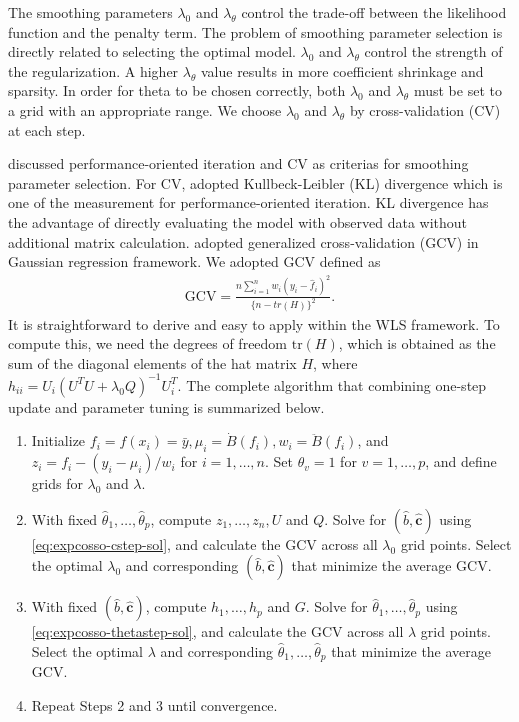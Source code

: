 The smoothing parameters \(\lambda_0\) and \(\lambda_\theta\) control the trade-off between the likelihood function and the penalty term. The problem of smoothing parameter selection is directly related to selecting the optimal model. \(\lambda_0\) and \(\lambda_\theta\) control the strength of the regularization. A higher \(\lambda_\theta\) value results in more coefficient shrinkage and sparsity. In order for theta to be chosen correctly, both \(\lambda_0\) and \(\lambda_\theta\) must be set to a grid with an appropriate range. We choose \(\lambda_0\) and \(\lambda_\theta\) by cross-validation (CV) at each step.

\citet{Gu:2013} discussed performance-oriented iteration and CV as criterias for smoothing parameter selection. For CV, \citet{Zhang:2006} adopted Kullbeck-Leibler (KL) divergence which is one of the measurement for performance-oriented iteration. KL divergence has the advantage of directly evaluating the model with observed data without additional matrix calculation. \citet{Lin:2006} adopted generalized cross-validation (GCV) in Gaussian regression framework. We adopted GCV defined as
\begin{align*}
    \text{GCV} = \frac{n\sum_{i=1}^{n}w_i(y_i-\hat{f}_i)^2}{\{n-tr(H)\}^2}.
\end{align*}
It is straightforward to derive and easy to apply within the WLS framework. To compute this, we need the degrees of freedom \(\text{tr}(H)\), which is obtained as the sum of the diagonal elements of the hat matrix \(H\), where \(h_{ii} = U_i (U^T U + \lambda_0 Q)^{-1} U_i^T\).
The complete algorithm that combining one-step update and parameter tuning is summarized below.

\begin{enumerate}
\def\labelenumi{\arabic{enumi}.}
\item
  Initialize \(f_i = f(x_i) = \bar{y}, \mu_i = \dot{B}(f_i), w_i = \ddot{B}(f_i)\), and \(z_i = f_i - (y_i - \mu_i)/w_i\) for \(i = 1, \dots, n\). Set \(\theta_v = 1\) for \(v = 1, \dots, p\), and define grids for \(\lambda_0\) and \(\lambda\).
\item
  With fixed \(\hat{\theta}_1, \dots, \hat{\theta}_p\), compute \(z_1, \dots, z_n,U\) and \(Q\). Solve for \((\hat{b}, \hat{\pmb{c}})\) using \eqref{eq:expcosso-cstep-sol}, and calculate the GCV across all \(\lambda_0\) grid points. Select the optimal \(\lambda_0\) and corresponding \((\hat{b}, \hat{\pmb{c}})\) that minimize the average GCV.
\item
  With fixed \((\hat{b}, \hat{\pmb{c}})\), compute \(h_1, \dots, h_p\) and \(G\). Solve for \(\hat{\theta}_1, \dots, \hat{\theta}_p\) using \eqref{eq:expcosso-thetastep-sol}, and calculate the GCV across all \(\lambda\) grid points. Select the optimal \(\lambda\) and corresponding \(\hat{\theta}_1, \dots, \hat{\theta}_p\) that minimize the average GCV.
\item
  Repeat Steps 2 and 3 until convergence.
\end{enumerate}


